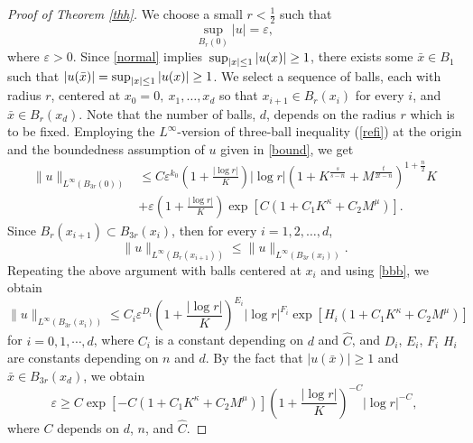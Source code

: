 \documentclass[11pt]{amsart}
\theoremstyle{plain}
\numberwithin{equation}{section}
\begin{document}
\begin{proof} [Proof of Theorem  \ref{thh}]
We choose a small $r < \frac 1 2$ such that
$$\sup_{B_r(0)}|u|={\varepsilon},$$
where ${\varepsilon}>0$.
Since \eqref{normal} implies ${\displaystyle} \sup_{|x|\leq 1}|u(x)|\geq 1$, there exists some $\bar x\in B_1$ such that ${\displaystyle} {\left\vert{u(\bar x)}\right\vert}=\sup_{|x|\leq 1}|u(x)|\geq 1$.
We select a sequence of balls, each with radius $r$, centered at $x_0=0, \ x_1, \ldots, x_d$ so that
$x_{i+1}\in B_{r}(x_i)$ for every $i$, and $\bar x\in B_{r}(x_d)$.
Note that the number of balls, $d$, depends on the radius $r$ which is to be fixed.
Employing the $L^\infty$-version of  three-ball inequality (\ref{refi}) at the origin and the boundedness assumption of $u$ given in \eqref{bound}, we get
\begin{align*}
\|u\|_{L^\infty {\left( {B_{3r}(0)} \right) }}
&\le C {\varepsilon}^{k_0} {\left( {1+\frac{|\log r|}{K}} \right) } {\left\vert{\log r}\right\vert}{\left( {1 + K^{\frac{s}{s-n}} + M^{\frac{t}{2t-n}}} \right) }^{1+\frac n 2}  K  \nonumber \\
&+ {\varepsilon} {\left( {1 + \frac{|\log r|}{K}} \right) } \exp{\left[{C{\left( {1 + C_1 K^\kappa + C_2 M^\mu} \right) } }\right]}.
\end{align*}
Since $B_r(x_{i+1})\subset B_{3r}(x_{i})$, then for every $i = 1, 2, \ldots, d$,
\begin{equation}
\|u\|_{L^\infty (B_r(x_{i+1}))}\leq  \|u\|_{L^\infty
(B_{3r}(x_{i}))}. \label{bbb}
\end{equation}
Repeating the above argument with balls centered at $x_i$ and using \eqref{bbb}, we obtain
\begin{equation*}
\|u\|_{L^\infty (B_{3r}(x_{i}))}
\leq C_i {\varepsilon}^{D_i} {\left( {1+\frac{|\log r|}{K}} \right) }^{E_i} |\log r|^{F_i}  \exp{\left[{H_i{\left( {1 + C_1 K^\kappa + C_2 M^\mu} \right) } }\right]}
\end{equation*}
for $i=0, 1, \cdots, d$, where $C_i$ is a constant depending on $d$ and $\hat C$, and $D_i$, $E_i$, $F_i$ $H_i$ are constants depending on $n$ and $d$.
By the fact that ${\left\vert{u(\bar x)}\right\vert} \geq 1$ and $\bar x \in B_{3r}(x_d)$, we obtain
\begin{equation*}
{\varepsilon}
\ge C \exp{\left[{-C {\left( {1 + C_1 K^\kappa + C_2 M^\mu} \right) } }\right]}{\left( {1+\frac{|\log r|}{K}} \right) }^{-C} |\log r|^{-C},
\end{equation*}
where $C$ depends on $d$, $n$, and $\hat C$.


\end{proof}
\end{document}

